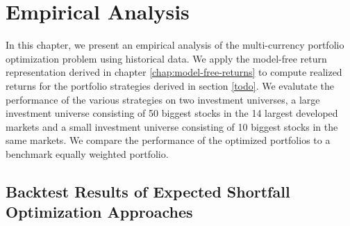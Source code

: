 \chapter{Empirical Analysis}\label{chap:empirical-analysis-and-baseline-results}

In this chapter, we present an empirical analysis of the multi-currency portfolio optimization problem using historical data. We apply the model-free return representation derived in chapter \ref{chap:model-free-returns} to compute realized returns for the portfolio strategies derived in section \ref{todo}. We evalutate the performance of the various strategies on two investment universes, a large investment universe consisting of 50 biggest stocks in the 14 largest developed markets and a small investment universe consisting of 10 biggest stocks in the same markets. We compare the performance of the optimized portfolios to a benchmark equally weighted portfolio. 


\section{Backtest Results of Expected Shortfall Optimization Approaches}


